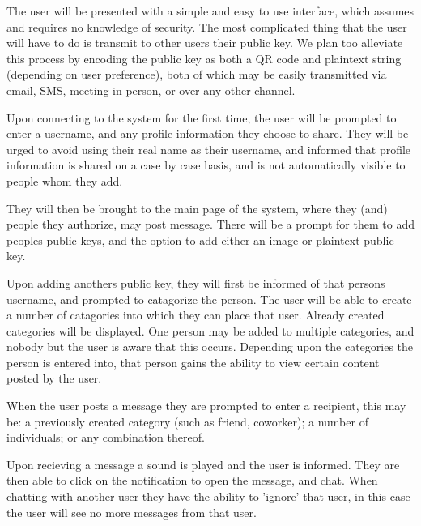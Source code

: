 The user will be presented with a simple and easy to use interface, which
assumes and requires no knowledge of security. The most complicated thing that
the user will have to do is transmit to other users their public key. We plan
too alleviate this process by encoding the public key as both a QR code and
plaintext string (depending on user preference), both of which may be easily
transmitted via email, SMS, meeting in person, or over any other channel.

Upon connecting to the system for the first time, the user will be prompted to
enter a username, and any profile information they choose to share. They will be
urged to avoid using their real name as their username, and informed that
profile information is shared on a case by case basis, and is not automatically
visible to people whom they add.

They will then be brought to the main page of the system, where they (and)
people they authorize, may post message. There will be a prompt for them to add
peoples public keys, and the option to add either an image or plaintext public
key.

Upon adding anothers public key, they will first be informed of that persons
username, and prompted to catagorize the person. The user will be able to create
a number of catagories into which they can place that user. Already created
categories will be displayed. One person may be added to multiple categories,
and nobody but the user is aware that this occurs. Depending upon the categories
the person is entered into, that person gains the ability to view certain
content posted by the user.

When the user posts a message they are prompted to enter a recipient, this may
be: a previously created category (such as friend, coworker); a number
of individuals; or any combination thereof.

Upon recieving a message a sound is played and the user is informed. They are
then able to click on the notification to open the message, and chat. When
chatting with another user they have the ability to 'ignore' that user, in this
case the user will see no more messages from that user.
